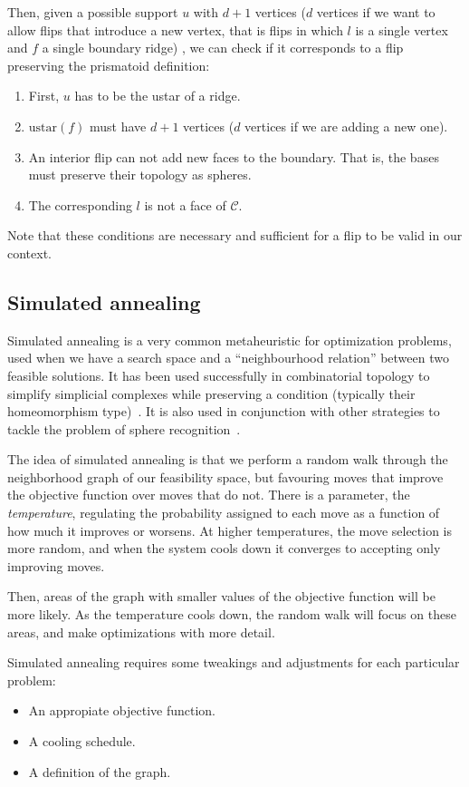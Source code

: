 \documentclass[12pt,a4paper]{article}
\theoremstyle{plain}
\theoremstyle{definition}
\begin{document}
Then, given a possible support $u$ with $d+1$ vertices ($d$ vertices if we want to allow flips that introduce a new vertex, that is flips in which $l$ is a single vertex and $f$ a single boundary ridge)
, we can check if it corresponds to a flip preserving the prismatoid definition:

\begin{enumerate}
  \item First, $u$ has to be the ustar of a ridge.
  \item $\text{ustar}(f)$ must have $d+1$ vertices ($d$ vertices if we are adding a new one).
  \item An interior flip can not add new faces to the boundary. That is, the bases must preserve their topology as spheres.
  \item The corresponding $l$ is not a face of $\mathcal{C}$.
\end{enumerate}

Note that these conditions are necessary and sufficient for a flip to be valid in our context.

\subsection{Simulated annealing}
Simulated annealing is a very common metaheuristic for optimization problems, used when we have a search space and a ``neighbourhood relation'' between two feasible solutions. It has been used successfully in combinatorial topology to simplify simplicial complexes while preserving a condition (typically their homeomorphism type)~\cite{Lutz}. It is also used in conjunction with other strategies to tackle the problem of sphere recognition~\cite{LutzMimi}.

The idea of simulated annealing is that we perform a random walk through the neighborhood graph of our feasibility space, but favouring moves that improve the objective function over moves that do not. There is a parameter, the \emph{temperature}, regulating the probability assigned to each move as a function of how much it improves or worsens. At higher temperatures, the move selection is more random, and when the system cools down it converges to accepting only improving moves. 

Then, areas of the graph with smaller values of the objective function will be more likely. As the temperature cools down, the random walk will focus on these areas, and make optimizations with more detail.

Simulated annealing requires some tweakings and adjustments for each particular problem:
\begin{itemize}
  \item An appropiate objective function.
  \item A cooling schedule.
  \item A definition of the graph.
\end{itemize}
\end{document}
